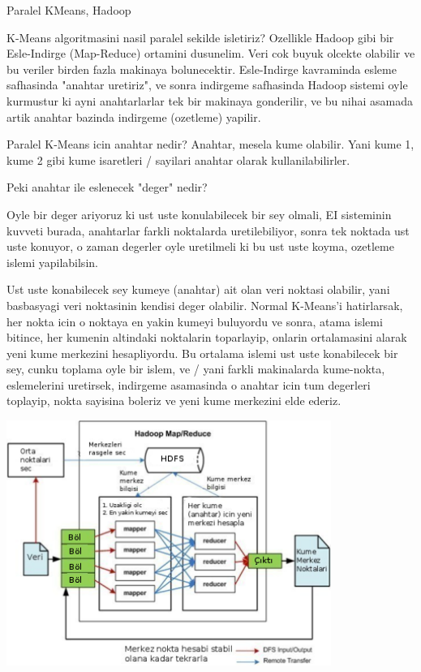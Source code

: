 \documentclass[12pt,fleqn]{article}\usepackage{../common}
\begin{document}
Paralel KMeans, Hadoop

K-Means algoritmasini nasil paralel sekilde isletiriz? Ozellikle Hadoop
gibi bir Esle-Indirge (Map-Reduce) ortamini dusunelim. Veri cok buyuk
olcekte olabilir ve bu veriler birden fazla makinaya
bolunecektir. Esle-Indirge kavraminda esleme safhasinda "anahtar uretiriz",
ve sonra indirgeme safhasinda Hadoop sistemi oyle kurmustur ki ayni
anahtarlarlar tek bir makinaya gonderilir, ve bu nihai asamada artik
anahtar bazinda indirgeme (ozetleme) yapilir.

Paralel K-Means icin anahtar nedir? Anahtar, mesela kume olabilir. Yani
kume 1, kume 2 gibi kume isaretleri / sayilari anahtar olarak
kullanilabilirler.

Peki anahtar ile eslenecek "deger" nedir?

Oyle bir deger ariyoruz ki ust uste konulabilecek bir sey olmali, EI
sisteminin kuvveti burada, anahtarlar farkli noktalarda uretilebiliyor,
sonra tek noktada ust uste konuyor, o zaman degerler oyle uretilmeli ki bu
ust uste koyma, ozetleme islemi yapilabilsin.

Ust uste konabilecek sey kumeye (anahtar) ait olan veri noktasi olabilir, yani basbasyagi veri noktasinin kendisi deger olabilir.  Normal K-Means'i hatirlarsak, her nokta icin o noktaya en yakin kumeyi buluyordu ve sonra, atama islemi bitince, her kumenin altindaki noktalarin toparlayip, onlarin ortalamasini alarak yeni kume merkezini hesapliyordu. Bu ortalama islemi ust uste konabilecek bir sey, cunku toplama oyle bir islem, ve / yani farkli makinalarda kume-nokta, eslemelerini uretirsek, indirgeme asamasinda o anahtar icin tum degerleri toplayip, nokta sayisina boleriz ve yeni kume merkezini elde ederiz. 

\includegraphics[height=8cm]{kmeans-diag.png}
\end{document}
